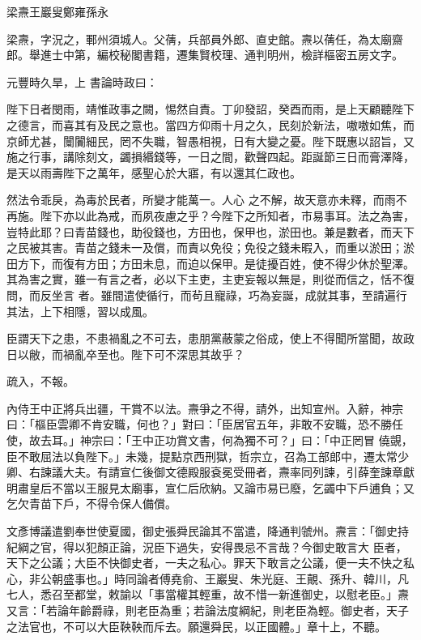 
\begin{pinyinscope}

 梁燾王巖叟鄭雍孫永



 梁燾，字況之，鄆州須城人。父蒨，兵部員外郎、直史館。燾以蒨任，為太廟齋郎。舉進士中第，編校秘閣書籍，遷集賢校理、通判明州，檢詳樞密五房文字。



 元豐時久旱，上
 書論時政曰：



 陛下日者閔雨，靖惟政事之闕，惕然自責。丁卯發詔，癸酉而雨，是上天顧聽陛下之德言，而喜其有及民之意也。當四方仰雨十月之久，民刻於新法，嗷嗷如焦，而京師尤甚，闤闠細民，罔不失職，智愚相視，日有大變之憂。陛下既惠以詔旨，又施之行事，講除刻文，蠲損緡錢等，一日之間，歡聲四起。距誕節三日而膏澤降，是天以雨壽陛下之萬年，感聖心於大寤，有以還其仁政也。



 然法令乖戾，為毒於民者，所變才能萬一。人心
 之不解，故天意亦未釋，而雨不再施。陛下亦以此為戒，而夙夜慮之乎？今陛下之所知者，市易事耳。法之為害，豈特此耶？曰青苗錢也，助役錢也，方田也，保甲也，淤田也。兼是數者，而天下之民被其害。青苗之錢未一及償，而責以免役；免役之錢未暇入，而重以淤田；淤田方下，而復有方田；方田未息，而迫以保甲。是徒擾百姓，使不得少休於聖澤。其為害之實，雖一有言之者，必以下主吏，主吏妄報以無是，則從而信之，恬不復問，而反坐言
 者。雖間遣使循行，而茍且寵祿，巧為妄誕，成就其事，至請遍行其法，上下相隱，習以成風。



 臣謂天下之患，不患禍亂之不可去，患朋黨蔽蒙之俗成，使上不得聞所當聞，故政日以敝，而禍亂卒至也。陛下可不深思其故乎？



 疏入，不報。



 內侍王中正將兵出疆，干賞不以法。燾爭之不得，請外，出知宣州。入辭，神宗曰：「樞臣雲卿不肯安職，何也？」對曰：「臣居官五年，非敢不安職，恐不勝任使，故去耳。」神宗曰：「王中正功賞文書，何為獨不可？」曰：「中正罔冒
 僥覬，臣不敢屈法以負陛下。」未幾，提點京西刑獄，哲宗立，召為工部郎中，遷太常少卿、右諫議大夫。有請宣仁後御文德殿服袞冕受冊者，燾率同列諫，引薛奎諫章獻明肅皇后不當以王服見太廟事，宣仁后欣納。又論市易已廢，乞蠲中下戶逋負；又乞欠青苗下戶，不得令保人備償。



 文彥博議遣劉奉世使夏國，御史張舜民論其不當遣，降通判虢州。燾言：「御史持紀綱之官，得以犯顏正論，況臣下過失，安得畏忌不言哉？今御史敢言大
 臣者，天下之公議；大臣不快御史者，一夫之私心。罪天下敢言之公議，便一夫不快之私心，非公朝盛事也。」時同論者傅堯俞、王巖叟、朱光庭、王覿、孫升、韓川，凡七人，悉召至都堂，敕諭以「事當權其輕重，故不惜一新進御史，以慰老臣。」燾又言：「若論年齡爵祿，則老臣為重；若論法度綱紀，則老臣為輕。御史者，天子之法官也，不可以大臣鞅鞅而斥去。願還舜民，以正國體。」章十上，不聽。




\end{pinyinscope}
